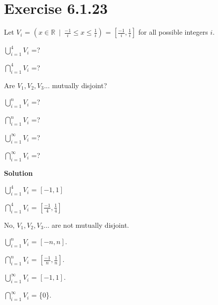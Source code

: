 \documentclass{article}
\newcommand{\enterProblemHeader}[1]{
    \nobreak\extramarks{}{Exercise {#1} continued on next page\ldots}\nobreak{}
    \nobreak\extramarks{Exercise {#1} (continued)}{Exercise {#1} continued on next page\ldots}\nobreak{}
}
\newcommand{\exitProblemHeader}[1]{
    \nobreak\extramarks{Exercise {#1} (continued)}{Exercise {#1} continued on next page\ldots}\nobreak{}
    \nobreak\extramarks{Exercise \arabic{#1}}{}\nobreak{}
}
\newenvironment{homeworkProblem}[1][-1]{
    \nobreak\extramarks{Page \thepage}{}\nobreak{}
    \section{Exercise {#1}}
}{
}
\begin{document}
\begin{homeworkProblem}[6.1.23]
    Let $V_{i}$ = $\left( x \in \mathbb{R} ~\mid~ \frac{-1}{i} \leq x \leq \frac{1}{i} \right)$
    = $\left[ \frac{-1}{i}, \frac{1}{i} \right]$ for all possible integers \(i\). \newline

    \begin{inparaenum}
        \item\label{q1a} $\bigcup \limits_{i=1}^4 V_{i}$ =? ~~~
        \item\label{q1b} $\bigcap \limits_{i=1}^4 V_{i}$ =? ~~~
        \item\label{q1b} Are $V_{1}, V_{2}, V_{3}...$ mutually disjoint? ~~~
        \item\label{q1b} $\bigcup \limits_{i=1}^n V_{i}$ =? ~~~
        \item\label{q1b} $\bigcap \limits_{i=1}^n V_{i}$ =? ~~~
        \item\label{q1b} $\bigcup \limits_{i=1}^\infty V_{i}$ =? ~~~
        ~~\item\label{q1b} $\bigcap \limits_{i=1}^\infty V_{i}$ =? ~~~
    \end{inparaenum}\newline

    \textbf{Solution}\newline

    \begin{inparaenum}
        \item\label{q1a} $\bigcup \limits_{i=1}^4 V_{i}$ = $\left[-1, 1\right]$~~~
        \item\label{q1a} $\bigcap \limits_{i=1}^4 V_{i}$ = $\left[\frac{-1}{4}, \frac{1}{4}\right]$~~~
        \item\label{q1a} No, $V_{1}, V_{2}, V_{3}...$ are not mutually disjoint. \newline
        \item\label{q1a} $\bigcup \limits_{i=1}^n V_{i}$ = $\left[-n, n\right]$.~
        \item\label{q1a} $\bigcap \limits_{i=1}^n V_{i}$ = $\left[\frac{-1}{n}, \frac{1}{n}\right]$.~
        ~\item\label{q1a} $\bigcup \limits_{i=1}^\infty V_{i}$ = $\left[-1, 1\right]$. ~~
        \item\label{q1a} $\bigcap \limits_{i=1}^\infty V_{i}$ = \{0\}. ~~~
    \end{inparaenum}\newline
\end{homeworkProblem}
\end{document}
